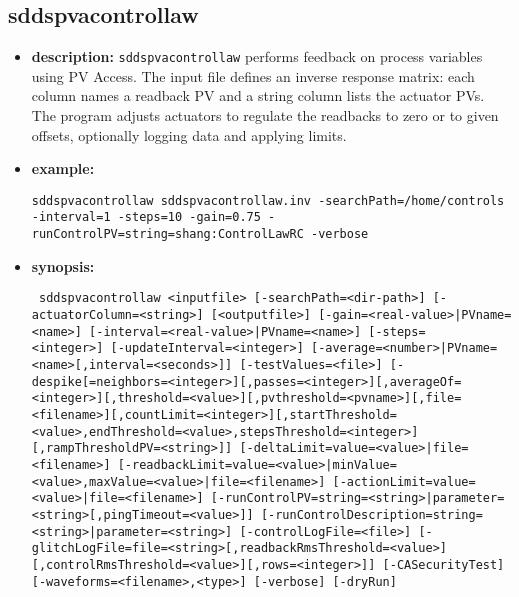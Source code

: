 %
%
\begin{latexonly}
\newpage
\end{latexonly}

\subsection{sddspvacontrollaw}
\label{sddspvacontrollaw}

\begin{itemize}
\item {\bf description:}
\verb+sddspvacontrollaw+ performs feedback on process variables using PV Access. The
input file defines an inverse response matrix: each column names a readback PV and a
string column lists the actuator PVs. The program adjusts actuators to regulate the
readbacks to zero or to given offsets, optionally logging data and applying limits.

\item {\bf example:}
\begin{flushleft}{\tt sddspvacontrollaw sddspvacontrollaw.inv -searchPath=/home/controls -interval=1 -steps=10 -gain=0.75 -runControlPV=string=shang:ControlLawRC -verbose}\end{flushleft}

\item {\bf synopsis:}
\begin{flushleft}{\tt
sddspvacontrollaw <inputfile> [-searchPath=<dir-path>] [-actuatorColumn=<string>] [<outputfile>]\
[-gain={<real-value>|PVname=<name>}] [-interval={<real-value>|PVname=<name>}] [-steps=<integer>]\
[-updateInterval=<integer>] [-average={<number>|PVname=<name>}[,interval=<seconds>]]\
[-testValues=<file>]\
[-despike[=neighbors=<integer>][,passes=<integer>][,averageOf=<integer>][,threshold=<value>][,pvthreshold=<pvname>][,file=<filename>][,countLimit=<integer>][,startThreshold=<value>,endThreshold=<value>,stepsThreshold=<integer>][,rampThresholdPV=<string>]]\
[-deltaLimit={value=<value>|file=<filename>}]\
[-readbackLimit={value=<value>|minValue=<value>,maxValue=<value>|file=<filename>}]\
[-actionLimit={value=<value>|file=<filename>}]\
[-runControlPV={string=<string>|parameter=<string>}[,pingTimeout=<value>]]\
[-runControlDescription={string=<string>|parameter=<string>}] [-controlLogFile=<file>]\
[-glitchLogFile=file=<string>[,readbackRmsThreshold=<value>][,controlRmsThreshold=<value>][,rows=<integer>]]\
[-CASecurityTest] [-waveforms=<filename>,<type>] [-verbose] [-dryRun]}
\end{flushleft}


\end{itemize}
